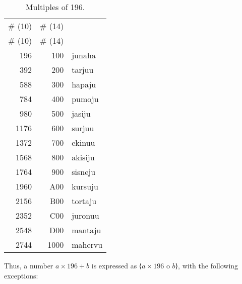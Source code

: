 \documentclass{book}
\newcommand{\ortho}[1]{⟨#1⟩}
\begin{document}
\begin{longtabu}[c]{|r|r|X|}
    \caption{Multiples of 196.}
    \centering
    
    \\ \hline
    \# (10) & \# (14) & \\
    \hline
    \endfirsthead
    
    \hline
    \# (10) & \# (14) & \\
    \hline
    \endhead
    
    \hline
    \endfoot
    
    \hline
    \endlastfoot
    
    196 & 100 & junaha \\
    392 & 200 & tarjuu \\
    588 & 300 & hapaju \\
    784 & 400 & pumoju \\
    980 & 500 & jasiju \\
    1176 & 600 & surjuu \\
    1372 & 700 & ekinuu \\
    1568 & 800 & akisiju \\
    1764 & 900 & sisneju \\
    1960 & A00 & kursuju \\
    2156 & B00 & tortaju \\
    2352 & C00 & juronuu \\
    2548 & D00 & mantaju \\
    2744 & 1000 & mahervu \\
\end{longtabu}

Thus, a number $a \times 196 + b$ is expressed as \ortho{$a \times 196$ o $b$}, with the following exceptions:
\end{document}
